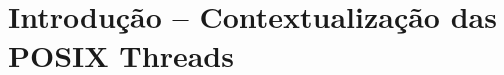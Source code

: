 \documentclass[conference,compsoc]{IEEEtran}
\begin{document}
\maketitle







%
\IEEEpeerreviewmaketitle




 

\section{Introdução -- Contextualização das POSIX Threads}
\end{document}
